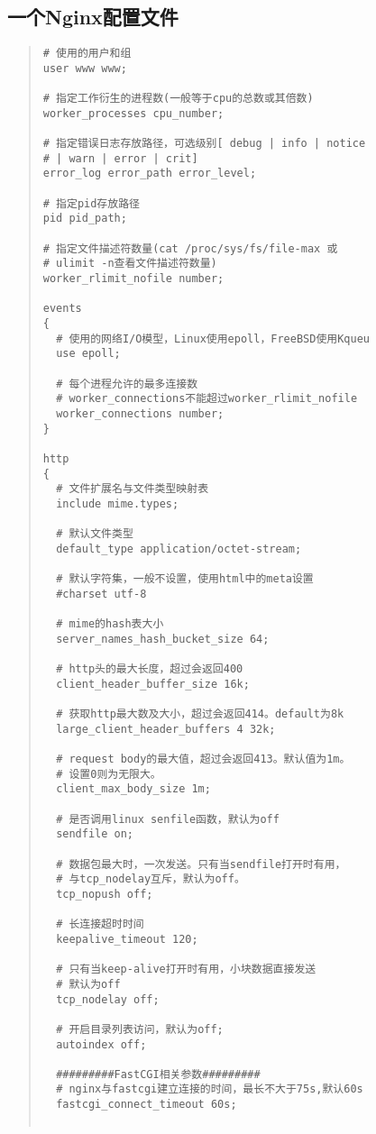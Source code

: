 \documentclass[UTF8]{ctexart}
\newenvironment{myquote}
  {\begin{quote} \kaishu \zihao{-5}}
  {\end{quote}}
\begin{document}
\subsection{一个Nginx配置文件}
\begin{myquote}
  \begin{verbatim}
# 使用的用户和组
user www www;
    
# 指定工作衍生的进程数(一般等于cpu的总数或其倍数)
worker_processes cpu_number;
    
# 指定错误日志存放路径，可选级别[ debug | info | notice 
# | warn | error | crit]
error_log error_path error_level;
    
# 指定pid存放路径
pid pid_path;
    
# 指定文件描述符数量(cat /proc/sys/fs/file-max 或 
# ulimit -n查看文件描述符数量)
worker_rlimit_nofile number;
    
events
{
  # 使用的网络I/O模型，Linux使用epoll，FreeBSD使用Kqueu
  use epoll;
      
  # 每个进程允许的最多连接数
  # worker_connections不能超过worker_rlimit_nofile
  worker_connections number;
}
    
http
{
  # 文件扩展名与文件类型映射表
  include mime.types;

  # 默认文件类型
  default_type application/octet-stream;

  # 默认字符集，一般不设置，使用html中的meta设置
  #charset utf-8

  # mime的hash表大小
  server_names_hash_bucket_size 64;

  # http头的最大长度，超过会返回400
  client_header_buffer_size 16k;

  # 获取http最大数及大小，超过会返回414。default为8k
  large_client_header_buffers 4 32k;

  # request body的最大值，超过会返回413。默认值为1m。
  # 设置0则为无限大。
  client_max_body_size 1m;

  # 是否调用linux senfile函数，默认为off
  sendfile on;

  # 数据包最大时，一次发送。只有当sendfile打开时有用，
  # 与tcp_nodelay互斥，默认为off。
  tcp_nopush off;

  # 长连接超时时间
  keepalive_timeout 120;

  # 只有当keep-alive打开时有用，小块数据直接发送
  # 默认为off
  tcp_nodelay off;

  # 开启目录列表访问，默认为off;
  autoindex off;

  #########FastCGI相关参数#########
  # nginx与fastcgi建立连接的时间，最长不大于75s,默认60s
  fastcgi_connect_timeout 60s;


\end{verbatim}
\end{myquote}
\end{document}
